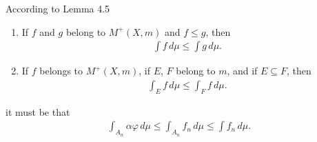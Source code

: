 \documentclass{beamer}
\numberwithin{equation}{section}
\begin{document}
\begin{frame}\frametitle{{\normalsize \secname} \\ {\large \subsecname}}
    According to Lemma 4.5
    \begingroup
    \small
    \begin{lemma}
        \begin{enumerate}
            \item If $f$ and $g$ belong to $M^+(X,m)$ and $f \leq g$, then
            \begin{align}
                \int f \, d\mu \leq \int g \, d\mu.
            \end{align}
            \item If $f$ belongs to $M^+(X,m)$, if $E$, $F$ belong to $m$, and if $E\subseteq F$, then
            \begin{align}
                \int_E f \, d\mu \leq \int_F f \, d\mu.
            \end{align}
        \end{enumerate}
    \end{lemma}
    \endgroup
    it must be that
    \begin{align}
        \int_{A_n} \alpha \varphi \, d\mu \leq \int_{A_n} f_n \, d\mu \leq \int f_n \, d\mu.
    \end{align}
\end{frame}
\end{document}
